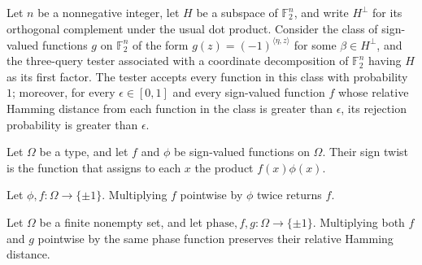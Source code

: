 \begin{theorem}
\label{FABL.perpendicularCharacterFunctionTester_isLocalTester}
\leanok
{}
Let $n$ be a nonnegative integer, let $H$ be a subspace of $\mathbb{F}_2^n$, and write
$H^\perp$ for its orthogonal complement under the usual dot product. Consider the class
of sign-valued functions $g$ on $\mathbb{F}_2^n$ of the form $g(z)=(-1)^{\langle\eta,z\rangle}$
for some $\beta\in H^\perp$, and the three-query tester associated with a coordinate
decomposition of $\mathbb{F}_2^n$ having $H$ as its first factor. The tester accepts every
function in this class with probability $1$; moreover, for every $\epsilon\in[0,1]$ and
every sign-valued function $f$ whose relative Hamming distance from each function in the
class is greater than $\epsilon$, its rejection probability is greater than $\epsilon$.
\end{theorem}

\begin{definition}
\label{FABL.signTwist}
\leanok
{}
Let $\Omega$ be a type, and let $f$ and $\phi$ be sign-valued functions on $\Omega$.
Their sign twist is the function that assigns to each $x$ the product $f(x)\phi(x)$.
\end{definition}

\begin{theorem}
\label{FABL.signTwist_involutive}
\leanok
{}
Let $\phi,f:\Omega\to\{\pm1\}$. Multiplying $f$ pointwise by $\phi$ twice returns $f$.
\end{theorem}

\begin{theorem}
\label{FABL.relativeHammingDist_signTwist}
\leanok
{}
Let $\Omega$ be a finite nonempty set, and let $\mathrm{phase},f,g:\Omega\to\{\pm1\}$.
Multiplying both $f$ and $g$ pointwise by the same phase function preserves their
relative Hamming distance.
\end{theorem}

